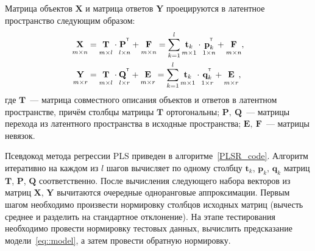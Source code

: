 \documentclass[12pt,twoside]{article}
\newcommand{\bY}{\mathbf{Y}}
\newcommand{\bX}{\mathbf{X}}
\newcommand{\bt}{\mathbf{t}}
\newcommand{\bp}{\mathbf{p}}
\newcommand{\bq}{\mathbf{q}}
\newcommand{\bP}{\mathbf{P}}
\newcommand{\bT}{\mathbf{T}}
\newcommand{\bQ}{\mathbf{Q}}
\newcommand{\bE}{\mathbf{E}}
\newcommand{\bF}{\mathbf{F}}
\newcommand{\T}{^{\text{\tiny\sffamily\upshape\mdseries T}}}
\begin{document}
Матрица объектов $\bX$ и матрица ответов $\bY$ проецируются в латентное пространство следующим образом: 
\begin{align}
\label{eq::PLS_X}
 \underset{m \times n}{\vphantom{\bQ}\bX} 
 &= \underset{m \times l}{\vphantom{\bQ}\bT} \cdot \underset{l \times n}{\vphantom{\bQ}\bP^{\T}} + \underset{m \times n}{\vphantom{\bQ}\bF} 
 = \sum_{k=1}^l \underset{m \times 1}{\vphantom{\bp_k^{\T}}\bt_k} \cdot \underset{1 \times n}{\bp_k^{\T}} + \underset{m \times n}{\vphantom{\bp_k^{\T}}\bF},\\
 \label{eq::PLS_Y}
 \underset{m \times r}{\vphantom{\bQ}\bY} 
 &= \underset{m \times l}{\vphantom{\bQ}\bT} \cdot \underset{l \times r}{\bQ^{\T}} + \underset{m \times r}{\vphantom{\bQ}\bE}
 =  \sum_{k=1}^l  \underset{m \times 1}{\vphantom{\bq_k^{\T}}\bt_k} \cdot \underset{1 \times r}{\bq_k^{\T}} +  \underset{m \times r}{\vphantom{\bq_k^{\T}}\bE},
\end{align}
где $\bT$~--- матрица совместного описания объектов и ответов в латентном пространстве, причём столбцы матрицы $\bT$ ортогональны; $\bP,\ \bQ$~--- матрицы перехода из латентного пространства в  исходные пространства; $\bE,\ \bF$~--- матрицы невязок. 

Псевдокод метода регрессии PLS приведен в алгоритме~\ref{PLSR_code}.
Алгоритм итеративно на каждом из $l$ шагов вычисляет по одному столбцу $\bt_k$, $\bp_k$, $\bq_k$ матриц $\bT$, $\bP$, $\bQ$ соответственно. После вычисления следующего набора векторов из матриц $\bX$, $\bY$ вычитаются очередные одноранговые аппроксимации. 
Первым шагом необходимо произвести нормировку столбцов исходных матриц (вычесть среднее и разделить на стандартное отклонение).
На этапе тестирования необходимо провести нормировку тестовых данных, вычислить предсказание модели~\ref{eq::model}, а затем провести обратную нормировку.
\end{document}
